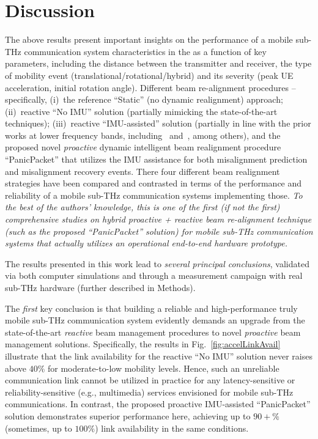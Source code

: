 \documentclass[fleqn,10pt]{wlscirep}
\begin{document}
\section*{Discussion}

The above results present important insights on the performance of a mobile sub-THz communication system characteristics in the as a function of key parameters, including the distance between the transmitter and receiver, the type of mobility event (translational/rotational/hybrid) and its severity (peak UE acceleration, initial rotation angle). Different beam re-alignment procedures -- specifically, (i)~the reference ``Static'' (no dynamic realignment) approach; (ii)~reactive ``No IMU'' solution (partially mimicking the state-of-the-art techniques); (iii)~reactive ``IMU-assisted'' solution (partially in line with the prior works at lower frequency bands, including~\cite{s141019622} and~\cite{Brambilla_2019}, among others), and the proposed novel \emph{proactive} dynamic intelligent beam realignment procedure ``PanicPacket'' that utilizes the IMU assistance for both misalignment prediction and misalignment recovery events. There four different beam realignment strategies have been compared and contrasted in terms of the performance and reliability of a mobile sub-THz communication systems implementing those. \emph{To the best of the authors' knowledge, this is one of the first (if not the first) comprehensive studies on hybrid proactive + reactive beam re-alignment technique (such as the proposed ``PanicPacket'' solution) for mobile sub-THz communication systems that actually utilizes an operational end-to-end hardware prototype.}

The results presented in this work lead to \emph{several principal conclusions}, validated via both computer simulations and through a measurement campaign with real sub-THz hardware (further described in Methods).

The \emph{first} key conclusion is that building a reliable and high-performance truly mobile sub-THz communication system evidently demands an upgrade from the state-of-the-art \emph{reactive} beam management procedures to novel \emph{proactive} beam management solutions. Specifically, the results in Fig.~\ref{fig:accelLinkAvail} illustrate that the link availability for the reactive ``No IMU'' solution never raises above $40\%$ for moderate-to-low mobility levels. Hence, such an unreliable communication link cannot be utilized in practice for any latency-sensitive or reliability-sensitive (e.g., multimedia) services envisioned for mobile sub-THz communications. In contrast, the proposed proactive IMU-assisted ``PanicPacket'' solution demonstrates superior performance here, achieving up to $90+\%$ (sometimes, up to $100\%$) link availability in the same conditions.
\end{document}
